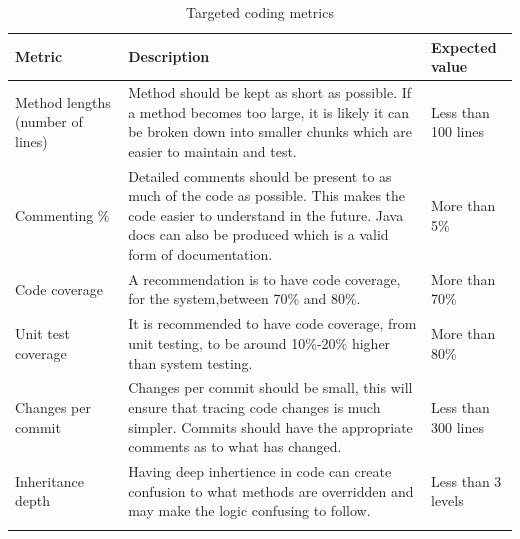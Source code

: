 \clearpage
\begin{longtable}{|p{}|p{}|p{}|}
    \hline
    Metric                              & Description                                                                                                                                                                                             & Expected value      \\
    \hline\hline
    Method lengths (number of lines)    & Method should be kept as short as possible. If a method becomes too large, it is likely it can be broken down into smaller chunks which are easier to maintain and test.                                & Less than 100 lines \\
    \hline
    Commenting \%                       & Detailed comments should be present to as much of the code as possible. This makes the code easier to understand in the future. Java docs can also be produced which is a valid form of documentation.  & More than 5\%       \\
    \hline
    Code coverage                       & A recommendation is to have code coverage, for the system,between 70\% and 80\%.                                                                                                                        & More than 70\%      \\
    \hline
    Unit test coverage                  & It is recommended to have code coverage, from unit testing, to be around 10\%-20\% higher than system testing.                                                                                          & More than 80\%      \\
    \hline
    Changes per commit                  & Changes per commit should be small, this will ensure that tracing code changes is much simpler. Commits should have the appropriate comments as to what has changed.                                    & Less than 300 lines \\
    \hline
    Inheritance depth                   & Having deep inhertience in code can create confusion to what methods are overridden and may make the logic confusing to follow.                                                                         & Less than 3 levels  \\
    \hline

    \caption{Targeted coding metrics}
\end{longtable}


